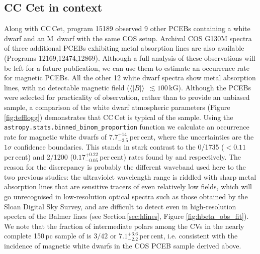 \documentclass[fleqn,usenatbib]{mnras}
\newcommand{\bs}{\ensuremath{\langle \vert B \vert \rangle}}
\newcommand{\Teff}{\mbox{$T_{\mathrm{eff}}$}}
\newcommand{\bgc}[1]{\textcolor{orange}{[#1]}}
\begin{document}
\subsection{CC Cet in context}






Along with CC\,Cet, program 15189 observed 9 other PCEBs containing a white dwarf and an M~dwarf with the same COS setup. Archival COS G130M spectra of three additional PCEBs exhibiting metal absorption lines are also available (Programs 12169,12474,12869). Although a full analysis of these observations will be left for a future publication, we can use them to estimate an occurrence rate for magnetic PCEBs. All the other 12 white dwarf spectra show metal absorption lines, with no detectable magnetic field (\bs\ $\lesssim100$\,kG). Although the PCEBs were selected for practicality of observation, rather than to provide an unbiased sample, a comparison of the white dwarf atmospheric parameters (Figure \ref{fig:tefflogg}) demonstrates that CC\,Cet is typical of the sample. Using the \texttt{astropy.stats.binned\_binom\_proportion} function we calculate an occurrence rate for magnetic white dwarfs of $7.7^{+14}_{-2.5}$\,per\,cent, where the uncertainties are the $1\sigma$ confidence boundaries. This stands in stark contrast to the 0/1735 ($<0.11$\,per\,cent) and 2/1200 ($0.17^{+0.22}_{-0.05}$\,per\,cent) rates found by \citet{liebertetal15-1} and \citep{silvestrietal07-1} respectively. The reason for the discrepancy is probably the different waveband used here to the two previous studies: the ultraviolet wavelength range is riddled with sharp metal absorption lines that are sensitive tracers of even relatively low fields, which will go unrecognised in low-resolution optical spectra such as those obtained by the Sloan Digital Sky Survey, and are difficult to detect even in high-resolution spectra of the Balmer lines (see Section\,\ref{sec:hlines}, Figure \ref{fig:hbeta_obs_fit}). We note that the fraction of intermediate polars among the CVs in the nearly complete 150\,pc sample of \citet{palaetal20-1} is $3/42$ or $7.1^{+6.6}_{-2.2}$\,per\,cent, i.e. consistent with the incidence of magnetic white dwarfs in the COS PCEB sample derived above.
\end{document}
